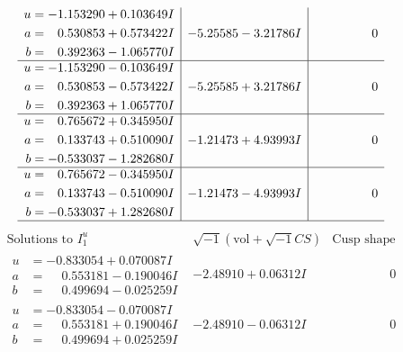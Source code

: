 \documentclass[1p]{elsarticle_modified}
\theoremstyle{definition}
\newcommand{\I}{\sqrt{-1}}
\begin{document}
$$\begin{array}{c|c|c}
\begin{aligned}
u &= -1.153290 + 0.103649 I \\
a &= \phantom{-}0.530853 + 0.573422 I \\
b &= \phantom{-}0.392363 - 1.065770 I\end{aligned}
 & -5.25585 - 3.21786 I & \phantom{-0.000000 } 0 \\ \hline\begin{aligned}
u &= -1.153290 - 0.103649 I \\
a &= \phantom{-}0.530853 - 0.573422 I \\
b &= \phantom{-}0.392363 + 1.065770 I\end{aligned}
 & -5.25585 + 3.21786 I & \phantom{-0.000000 } 0 \\ \hline\begin{aligned}
u &= \phantom{-}0.765672 + 0.345950 I \\
a &= \phantom{-}0.133743 + 0.510090 I \\
b &= -0.533037 - 1.282680 I\end{aligned}
 & -1.21473 + 4.93993 I & \phantom{-0.000000 } 0 \\ \hline\begin{aligned}
u &= \phantom{-}0.765672 - 0.345950 I \\
a &= \phantom{-}0.133743 - 0.510090 I \\
b &= -0.533037 + 1.282680 I\end{aligned}
 & -1.21473 - 4.93993 I & \phantom{-0.000000 } 0\\
 \hline 
 \end{array}$$\newpage$$\begin{array}{c|c|c}  
\text{Solutions to }I^u_{1}& \I (\text{vol} + \sqrt{-1}CS) & \text{Cusp shape}\\
 \hline 
\begin{aligned}
u &= -0.833054 + 0.070087 I \\
a &= \phantom{-}0.553181 - 0.190046 I \\
b &= \phantom{-}0.499694 - 0.025259 I\end{aligned}
 & -2.48910 + 0.06312 I & \phantom{-0.000000 } 0 \\ \hline\begin{aligned}
u &= -0.833054 - 0.070087 I \\
a &= \phantom{-}0.553181 + 0.190046 I \\
b &= \phantom{-}0.499694 + 0.025259 I\end{aligned}
 & -2.48910 - 0.06312 I & \phantom{-0.000000 } 0 \\ \hline\begin{aligned}

\end{aligned}
\end{array}$$
\end{document}
